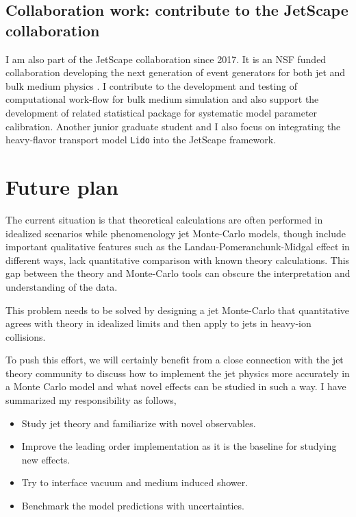 \documentclass[10pt,a4paper]{article}
\begin{document}
\subsection{  Collaboration work: contribute to the JetScape collaboration}

I am also part of the JetScape collaboration since 2017. It is an NSF funded collaboration developing the next generation of event generators for both jet and bulk medium physics \cite{JetScape}. 
I contribute to the development and testing of computational work-flow for bulk medium simulation and also support the development of related statistical package for systematic model parameter calibration.
Another junior graduate student and I also focus on integrating the heavy-flavor transport model {\tt Lido} into the JetScape framework.

\section{Future plan}
The current situation is that theoretical calculations are often performed in idealized scenarios while phenomenology jet Monte-Carlo models, though include important qualitative features such as the Landau-Pomeranchunk-Midgal effect in different ways, lack quantitative comparison with known theory calculations.
This gap between the theory and Monte-Carlo tools can obscure the interpretation and understanding of the data.

This problem needs to be solved by designing a jet Monte-Carlo that quantitative agrees with theory in idealized limits and then apply to jets in heavy-ion collisions.

To push this effort, we will certainly benefit from a close connection with the jet theory community to discuss how to implement the jet physics more accurately in a Monte Carlo model and what novel effects can be studied in such a way. I have summarized my responsibility as follows,
\begin{itemize}
\item Study jet theory and familiarize with novel observables.
\item Improve the leading order implementation as it is  the baseline for studying new effects.
\item Try to interface vacuum and medium induced shower.
\item Benchmark the model predictions with uncertainties.
\end{itemize}



\end{document}
